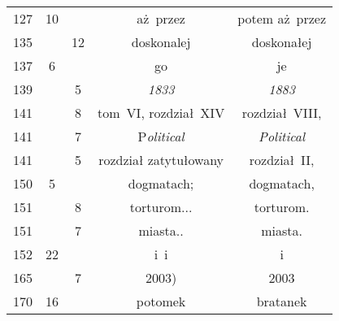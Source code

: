 \documentclass[a4paper,11pt]{article}
\begin{document}
\begin{center}
\begin{tabular}{|c|c|c|c|c|}
    127 & 10 & & aż~przez & potem aż~przez \\
    135 & & 12 & doskonalej & doskonałej \\
    137 &  6 & & go & je \\
    139 & &  5 & \textit{1833} & \textit{1883} \\
    141 & &  8 & tom~VI, rozdział~XIV & rozdział~VIII, \\
    141 & &  7 & P\textit{olitical} & \textit{Political} \\
    141 & &  5 & rozdział zatytułowany & rozdział~II, \\
    150 &  5 & & dogmatach; & dogmatach, \\
    151 & &  8 & torturom... & torturom. \\
    151 & &  7 & miasta.. & miasta. \\
    152 & 22 & & i~i & i \\
    165 & &  7 & 2003) & 2003 \\
    170 & 16 & & potomek & bratanek \\
    \hline
  \end{tabular}






\end{center}
\end{document}
